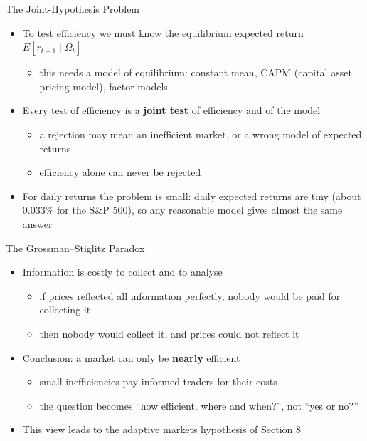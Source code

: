 \begin{frame}{The Joint-Hypothesis Problem}
\itemsize{\small}
\begin{itemize}
    \item To test efficiency we must know the equilibrium expected return $E[r_{t+1} \mid \Omega_t]$
    \begin{itemize}
        \item this needs a model of equilibrium: constant mean, CAPM (capital asset pricing model), factor models
    \end{itemize}
    \item Every test of efficiency is a \textbf{joint test} of efficiency and of the model 
    \begin{itemize}
        \item a rejection may mean an inefficient market, or a wrong model of expected returns
        \item efficiency alone can never be rejected
    \end{itemize}
    \item For daily returns the problem is small: daily expected returns are tiny (about $0.033\%$ for the S\&P 500), so any reasonable model gives almost the same answer
\end{itemize}
\end{frame}

\begin{frame}{The Grossman--Stiglitz Paradox}
\itemsize{\small}
\begin{itemize}
    \item Information is costly to collect and to analyse 
    \begin{itemize}
        \item if prices reflected all information perfectly, nobody would be paid for collecting it
        \item then nobody would collect it, and prices could not reflect it
    \end{itemize}
    \item Conclusion: a market can only be \textbf{nearly} efficient
    \begin{itemize}
        \item small inefficiencies pay informed traders for their costs
        \item the question becomes ``how efficient, where and when?'', not ``yes or no?''
    \end{itemize}
    \item This view leads to the adaptive markets hypothesis of Section 8
\end{itemize}
\end{frame}

